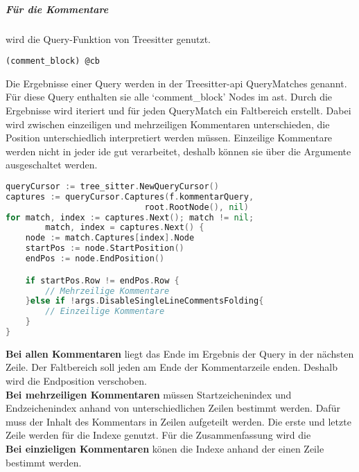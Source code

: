 \documentclass[./einleitung.tex]{subfiles}
\begin{document}
    \subparagraph{Für die Kommentare} wird die Query-Funktion von Treesitter genutzt.
    \begin{lstlisting}[capture=Die Query für alle Kommentare, label=lst:commentQuery]
(comment_block) @cb
    \end{lstlisting}
    Die Ergebnisse einer Query werden in der Treesitter-\acrshort{api} QueryMatches genannt.
    Für diese Query enthalten sie alle `comment_block' Nodes im \acrshort{ast}.
    Durch die Ergebnisse wird iteriert und für jeden QueryMatch ein Faltbereich erstellt.
    Dabei wird zwischen einzeiligen und mehrzeiligen Kommentaren unterschieden, die Position unterschiedlich interpretiert werden müssen.
    Einzeilige Kommentare werden nicht in jeder \acrshort{ide} gut verarbeitet, deshalb können sie über die Argumente ausgeschaltet werden.
    \begin{lstlisting}[language=Go, caption=Auszug aus der Bestimmung der Faltbereiche für die Kommentare, label=lst:foldingCommentsFor]
queryCursor := tree_sitter.NewQueryCursor()
captures := queryCursor.Captures(f.kommentarQuery,
                            root.RootNode(), nil)
for match, index := captures.Next(); match != nil;
        match, index = captures.Next() {
    node := match.Captures[index].Node
    startPos := node.StartPosition()
    endPos := node.EndPosition()

    if startPos.Row != endPos.Row {
        // Mehrzeilige Kommentare
    }else if !args.DisableSingleLineCommentsFolding{
        // Einzeilige Kommentare
    }
}
    \end{lstlisting}
    \textbf{Bei allen Kommentaren} liegt das Ende im Ergebnis der Query in der nächsten Zeile.
    Der Faltbereich soll jeden am Ende der Kommentarzeile enden.
    Deshalb wird die Endposition verschoben.\\
    \textbf{Bei mehrzeiligen Kommentaren} müssen Startzeichenindex und Endzeichenindex anhand von unterschiedlichen Zeilen bestimmt werden.
    Dafür muss der Inhalt des Kommentars in Zeilen aufgeteilt werden.
    Die erste und letzte Zeile werden für die Indexe genutzt.
    Für die Zusammenfassung wird die \\
    \textbf{Bei einzieligen Kommentaren} könen die Indexe anhand der einen Zeile bestimmt werden.
\end{document}
